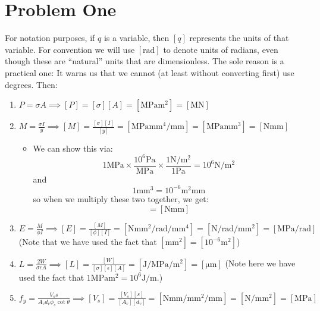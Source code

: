 \documentclass{article}
\begin{document}
\newpage
\section{Problem One}
For notation purposes, if $q$ is a variable, then $[q]$ represents the units of that variable. For convention we will use $[\si{\radian}]$ to denote units of radians, even though these are ``natural'' units that are dimensionless. The sole reason is a practical one: It warns us that we cannot (at least without converting first) use degrees. Then:
\begin{enumerate}[label=(\alph*)]
    \item $\displaystyle P=\sigma A \implies [P] = [\sigma][A] = [\si{\mega\pascal\meter\squared}] = [\si{\mega\newton}]$
    \item $\displaystyle M=\frac{\sigma I}{y} \implies [M]=\frac{[\sigma][I]}{[y]} = [\si{\mega\pascal\milli\metre\tothe{4}\per\milli\meter}]=[\si{\mega\pascal\milli\meter\cubed}] = [\si{\newton\milli\meter}]$
    \begin{itemize}
        \item We can show this via:
        \begin{equation}
            1 \si{\mega\pascal} \times \frac{10^6 \si{\pascal}}{ \si{\mega\pascal}} \times \frac{1\si{\newton\per\meter\squared}}{1\si{\pascal}} = 10^6 \si{\newton\per\meter\squared}
        \end{equation}
        and
        \begin{equation}
            1 \si{\milli\meter\cubed} = 10^{-6}\si{\meter\squared\milli\meter}
            \label{eq:}
        \end{equation}
        so when we multiply these two together, we get:
        \begin{equation}
            [\si{\mega\pascal\milli\meter\cubed}] = [\si{\newton\milli\meter}]
            \label{eq:}
        \end{equation}
        
        
    \end{itemize}
    \item $\displaystyle E=\frac{M}{\phi I} \implies [E]=\frac{[M]}{[\phi][I]}=[\si{\newton\milli\meter\squared\per\radian\per\milli\metre\tothe{4}}]=[\si{\newton\per\radian\per\milli\metre\squared}]=[\si{\mega\pascal\per\radian}]$ (Note that we have used the fact that $[\si{\milli\meter\squared}]=[10^{-6}\si{\meter\squared}]$)
    \item $\displaystyle L = \frac{2W}{\sigma\epsilon A} \implies [L] = \frac{[W]}{[\sigma][\epsilon][A]} = [\si{\joule\per\mega\pascal\per\meter\squared}]=[\si{\micro\meter}]$ (Note here we have used the fact that $1\si{\mega\pascal\meter\squared}=10^6 \si{\joule\per\meter}$.)
    \item $\displaystyle f_y = \frac{V_ss}{A_vd_v\phi_s\cot\theta}\implies [V_s]=\frac{[V_s][s]}{[A_v][d_v]}=[\si{\newton\milli\meter\per\milli\meter\squared\per\milli\meter}]=[\si{\newton\per\milli\meter\squared}]=[\si{\mega\pascal}]$
\end{enumerate}
\end{document}
